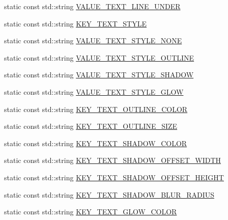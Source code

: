 \begin{DoxyCompactItemize}
static const std\+::string \hyperlink{classui_1_1RichText_a4af5934e4df5e3b363d2de9202f5ba1a}{V\+A\+L\+U\+E\+\_\+\+T\+E\+X\+T\+\_\+\+L\+I\+N\+E\+\_\+\+U\+N\+D\+ER}
\item 
static const std\+::string \hyperlink{classui_1_1RichText_a9fd78731e14ee45424277f1f09620146}{K\+E\+Y\+\_\+\+T\+E\+X\+T\+\_\+\+S\+T\+Y\+LE}
\item 
static const std\+::string \hyperlink{classui_1_1RichText_a64657467343deaeec8d7029808a82659}{V\+A\+L\+U\+E\+\_\+\+T\+E\+X\+T\+\_\+\+S\+T\+Y\+L\+E\+\_\+\+N\+O\+NE}
\item 
static const std\+::string \hyperlink{classui_1_1RichText_a65e983b7f1aac7c519b019a1720d8087}{V\+A\+L\+U\+E\+\_\+\+T\+E\+X\+T\+\_\+\+S\+T\+Y\+L\+E\+\_\+\+O\+U\+T\+L\+I\+NE}
\item 
static const std\+::string \hyperlink{classui_1_1RichText_a65fbbe1beb8e0b3cb5e37b3ed559d5bf}{V\+A\+L\+U\+E\+\_\+\+T\+E\+X\+T\+\_\+\+S\+T\+Y\+L\+E\+\_\+\+S\+H\+A\+D\+OW}
\item 
static const std\+::string \hyperlink{classui_1_1RichText_aa4091843d1db8368559d19884cf30324}{V\+A\+L\+U\+E\+\_\+\+T\+E\+X\+T\+\_\+\+S\+T\+Y\+L\+E\+\_\+\+G\+L\+OW}
\item 
static const std\+::string \hyperlink{classui_1_1RichText_ac6b353e040ab5cf03351bc66cb1c8027}{K\+E\+Y\+\_\+\+T\+E\+X\+T\+\_\+\+O\+U\+T\+L\+I\+N\+E\+\_\+\+C\+O\+L\+OR}
\item 
static const std\+::string \hyperlink{classui_1_1RichText_a0cb8a5126ed47a2f167b8dd7775ec61d}{K\+E\+Y\+\_\+\+T\+E\+X\+T\+\_\+\+O\+U\+T\+L\+I\+N\+E\+\_\+\+S\+I\+ZE}
\item 
static const std\+::string \hyperlink{classui_1_1RichText_a4b06b8bb8c20d1733d52a92326d4921c}{K\+E\+Y\+\_\+\+T\+E\+X\+T\+\_\+\+S\+H\+A\+D\+O\+W\+\_\+\+C\+O\+L\+OR}
\item 
static const std\+::string \hyperlink{classui_1_1RichText_aa85fdb82f7f36c2c88d4990f453ed9d6}{K\+E\+Y\+\_\+\+T\+E\+X\+T\+\_\+\+S\+H\+A\+D\+O\+W\+\_\+\+O\+F\+F\+S\+E\+T\+\_\+\+W\+I\+D\+TH}
\item 
static const std\+::string \hyperlink{classui_1_1RichText_ab892b910a46d88b2d3af24412ccfe226}{K\+E\+Y\+\_\+\+T\+E\+X\+T\+\_\+\+S\+H\+A\+D\+O\+W\+\_\+\+O\+F\+F\+S\+E\+T\+\_\+\+H\+E\+I\+G\+HT}
\item 
static const std\+::string \hyperlink{classui_1_1RichText_a278da76791afdec2de5bbc9a8df969f7}{K\+E\+Y\+\_\+\+T\+E\+X\+T\+\_\+\+S\+H\+A\+D\+O\+W\+\_\+\+B\+L\+U\+R\+\_\+\+R\+A\+D\+I\+US}
\item 
static const std\+::string \hyperlink{classui_1_1RichText_a9e4c9189d439ba1e0405c89a99c1723f}{K\+E\+Y\+\_\+\+T\+E\+X\+T\+\_\+\+G\+L\+O\+W\+\_\+\+C\+O\+L\+OR}

\end{DoxyCompactItemize}
